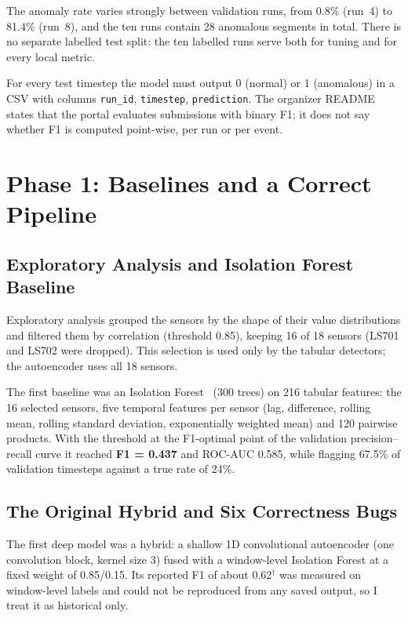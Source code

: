 \documentclass[runningheads]{llncs}
\newcommand{\doc}{$^\dagger$}
\begin{document}
The anomaly rate varies strongly between validation runs, from 0.8\% (run~4) to 81.4\% (run~8), and the ten runs contain 28 anomalous segments in total. There is no separate labelled test split: the ten labelled runs serve both for tuning and for every local metric.

For every test timestep the model must output 0 (normal) or 1 (anomalous) in a CSV with columns \texttt{run\_id}, \texttt{timestep}, \texttt{prediction}. The organizer README states that the portal evaluates submissions with binary F1; it does not say whether F1 is computed point-wise, per run or per event.

\section{Phase 1: Baselines and a Correct Pipeline}\label{sec:phase1}

\subsection{Exploratory Analysis and Isolation Forest Baseline}

Exploratory analysis grouped the sensors by the shape of their value distributions and filtered them by correlation (threshold 0.85), keeping 16 of 18 sensors (LS701 and LS702 were dropped). This selection is used only by the tabular detectors; the autoencoder uses all 18 sensors.

The first baseline was an Isolation Forest~\cite{liu2008isolation} (300 trees) on 216 tabular features: the 16 selected sensors, five temporal features per sensor (lag, difference, rolling mean, rolling standard deviation, exponentially weighted mean) and 120 pairwise products. With the threshold at the F1-optimal point of the validation precision--recall curve it reached \textbf{F1 = 0.437} and ROC-AUC 0.585, while flagging 67.5\% of validation timesteps against a true rate of 24\%.

\subsection{The Original Hybrid and Six Correctness Bugs}

The first deep model was a hybrid: a shallow 1D convolutional autoencoder (one convolution block, kernel size 3) fused with a window-level Isolation Forest at a fixed weight of 0.85/0.15. Its reported F1 of about 0.62\doc{} was measured on window-level labels and could not be reproduced from any saved output, so I treat it as historical only.
\end{document}
